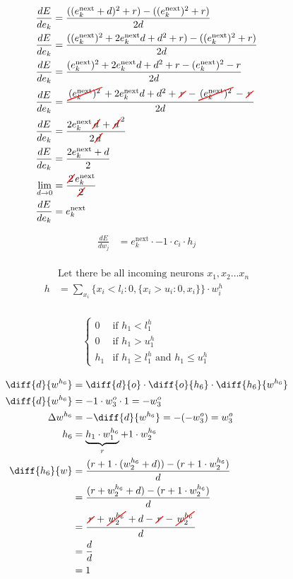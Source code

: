 \documentclass{article}
\newcommand{\cancel}[2][0.8pt]{%
	\tikz[baseline=(X.base)]{
		\node[inner sep=1pt] (X) {$#2$};
		\draw[line width=#1, red, line cap=round] (X.south west) -- (X.north east);
	}%
}
\begin{document}
\begin{align*}
	\frac{dE}{de_k}&=\frac{((e_k^\text{next}+d)^2+r)-((e_k^\text{next})^2+r)}{2d}\\
	\frac{dE}{de_k}&=\frac{((e_k^\text{next})^2+2e_k^\text{next}d+d^2+r)-((e_k^\text{next})^2+r)}{2d}\\
	\frac{dE}{de_k}&=\frac{(e_k^\text{next})^2+2e_k^\text{next}d+d^2+r-(e_k^\text{next})^2-r}{2d}\\
	\frac{dE}{de_k}&=\frac{\cancel{(e_k^\text{next})^2}+2e_k^\text{next}d+d^2+\cancel{r}-\cancel{(e_k^\text{next})^2}-\cancel{r}}{2d}\\
	\frac{dE}{de_k}&=\frac{2e_k^\text{next}\cancel{d}+\cancel{d}^2}{2\cancel{d}}\\
	\frac{dE}{de_k}&=\frac{2e_k^\text{next}+d}{2}\\
	\lim_{d\to 0}&=\frac{\cancel{2}e_k^\text{next}}{\cancel{2}}\\
	\frac{dE}{de_k}&=e_k^\text{next}\\
\end{align*} 

\begin{align*}
	\frac{dE}{dw_j}&=e_k^\text{next}\cdot -1\cdot c_i\cdot h_j\\
\end{align*}

\begin{align*}
	&\text{Let there be all incoming neurons }x_1,x_2\dots x_n\\
	h&=\sum_{x_i}\{x_i<l_i: 0, \{x_i>u_i: 0, x_i\}\}\cdot w^h_i\\
\end{align*}

\begin{align*}
	\begin{cases}
		0 & \text{if } h_1 < l^h_1\\
		0 & \text{if } h_1 > u^h_1\\
		h_1 & \text{if } h_1\geq l^h_1 \text{ and } h_1\leq u^h_1
	\end{cases}
\end{align*}

\begin{align*}
\diff{d}{w^{h_6}} &= \diff{d}{o} \cdot \diff{o}{h_6} \cdot \diff{h_6}{w^{h_6}}\\
\diff{d}{w^{h_6}} &= -1\cdot w_3^o \cdot 1=-w_3^o\\
\Delta w^{h_6} &= -\diff{d}{w^{h_6}}=-(-w_3^o)=w_3^o\\
h_6&=\underbrace{h_1\cdot w_1^{h_6}}_{r}+ 1\cdot w_2^{h_6}\\
\diff{h_6}{w}&=\frac{(r+1\cdot (w_2^{h_6}+d))-(r+1\cdot w_2^{h_6})}{d}\\
&=\frac{(r+w_2^{h_6}+d)-(r+1\cdot w_2^{h_6})}{d}\\
&=\frac{\cancel{r}+\cancel{w_2^{h_6}}+d-\cancel{r}-\cancel{w_2^{h_6}}}{d}\\
&=\frac{d}{d}\\
&=1
\end{align*}
\end{document}
